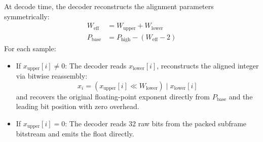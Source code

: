 \documentclass[10pt,twocolumn]{article}
\begin{document}
At decode time, the decoder reconstructs the alignment parameters symmetrically:
\begin{align}
	W_{\text{eff}}  & = W_{\text{upper}} + W_{\text{lower}}    \\
	P_{\text{base}} & = P_{\text{high}} - (W_{\text{eff}} - 2)
\end{align}
For each sample:
\begin{itemize}
	\item If $x_{\text{upper}}[i] \ne 0$: The decoder reads $x_{\text{lower}}[i]$, reconstructs the aligned integer via bitwise reassembly:
	      \begin{equation}
		      x_i = (x_{\text{upper}}[i] \ll W_{\text{lower}}) \mid x_{\text{lower}}[i]
	      \end{equation}
	      and recovers the original floating-point exponent directly from $P_{\text{base}}$ and the leading bit position with zero overhead.
	\item If $x_{\text{upper}}[i] = 0$: The decoder reads 32 raw bits from the packed subframe bitstream and emits the float directly.
\end{itemize}
\end{document}

